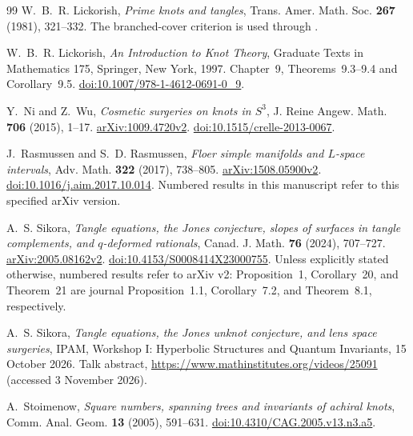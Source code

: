 \documentclass[11pt]{amsart}
\theoremstyle{definition}
\theoremstyle{remark}
\begin{document}
\begin{thebibliography}{99}
W.~B.~R. Lickorish,
\emph{Prime knots and tangles},
Trans. Amer. Math. Soc. \textbf{267} (1981),
321--332.
The branched-cover criterion is used through
\cite[Theorem~3.5(2)]{BM}.

W.~B.~R. Lickorish,
\emph{An Introduction to Knot Theory},
Graduate Texts in Mathematics 175, Springer, New York, 1997.
Chapter~9, Theorems~9.3--9.4 and Corollary~9.5.
\href{https://doi.org/10.1007/978-1-4612-0691-0_9}{doi:10.1007/978-1-4612-0691-0\_9}.

Y.~Ni and Z.~Wu,
\emph{Cosmetic surgeries on knots in \(S^3\)},
J. Reine Angew. Math. \textbf{706} (2015), 1--17.
\href{https://arxiv.org/abs/1009.4720}{arXiv:1009.4720v2}.
\href{https://doi.org/10.1515/crelle-2013-0067}{doi:10.1515/crelle-2013-0067}.

J.~Rasmussen and S.~D. Rasmussen,
\emph{Floer simple manifolds and \(L\)-space intervals},
Adv. Math. \textbf{322} (2017), 738--805.
\href{https://arxiv.org/abs/1508.05900}{arXiv:1508.05900v2}.
\href{https://doi.org/10.1016/j.aim.2017.10.014}{doi:10.1016/j.aim.2017.10.014}.
Numbered results in this manuscript refer to this
specified arXiv version.

A.~S. Sikora,
\emph{Tangle equations, the Jones conjecture, slopes of
surfaces in tangle complements, and \(q\)-deformed rationals},
Canad. J. Math. \textbf{76} (2024), 707--727.
\href{https://arxiv.org/abs/2005.08162}{arXiv:2005.08162v2}.
\href{https://doi.org/10.4153/S0008414X23000755}{doi:10.4153/S0008414X23000755}.
Unless explicitly stated otherwise, numbered results
refer to arXiv v2: Proposition~1, Corollary~20, and
Theorem~21 are journal Proposition~1.1, Corollary~7.2,
and Theorem~8.1, respectively.

A.~S. Sikora,
\emph{Tangle equations, the Jones unknot conjecture,
and lens space surgeries},
IPAM, Workshop I: Hyperbolic Structures and Quantum
Invariants, 15 October 2026.
Talk abstract,
\url{https://www.mathinstitutes.org/videos/25091}
(accessed 3 November 2026).

A.~Stoimenow,
\emph{Square numbers, spanning trees and invariants
of achiral knots},
Comm. Anal. Geom. \textbf{13} (2005), 591--631.
\href{https://doi.org/10.4310/CAG.2005.v13.n3.a5}{doi:10.4310/CAG.2005.v13.n3.a5}.

\end{thebibliography}
\end{document}

